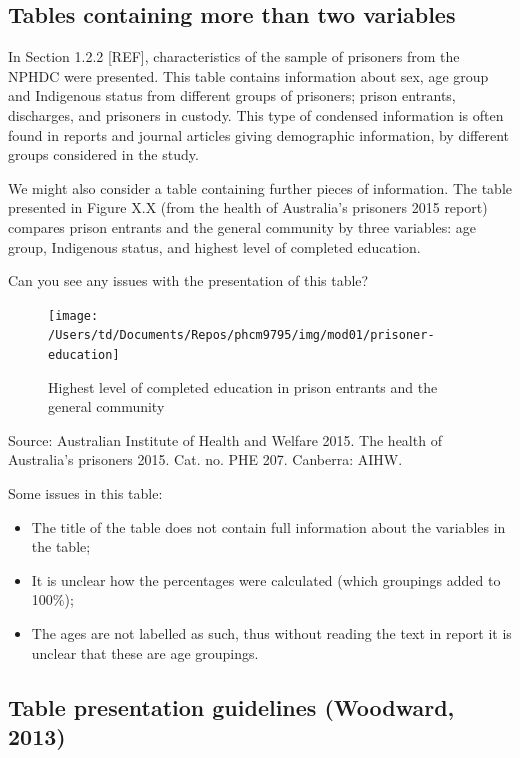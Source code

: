 \documentclass[
]{memoir}
\providecommand{\tightlist}{%
  \setlength{\itemsep}{0pt}\setlength{\parskip}{0pt}}
\begin{document}
\hypertarget{tables-containing-more-than-two-variables}{%
\subsection{Tables containing more than two variables}\label{tables-containing-more-than-two-variables}}

In Section 1.2.2 {[}REF{]}, characteristics of the sample of prisoners from the NPHDC were presented. This table contains information about sex, age group and Indigenous status from different groups of prisoners; prison entrants, discharges, and prisoners in custody. This type of condensed information is often found in reports and journal articles giving demographic information, by different groups considered in the study.

We might also consider a table containing further pieces of information. The table presented in Figure X.X (from the health of Australia's prisoners 2015 report) compares prison entrants and the general community by three variables: age group, Indigenous status, and highest level of completed education.

Can you see any issues with the presentation of this table?

\begin{figure}
\texttt{[image: /Users/td/Documents/Repos/phcm9795/img/mod01/prisoner-education]} \caption{Highest level of completed education in prison entrants and the general community}\label{fig:fig-prison-education}
\end{figure}

Source: Australian Institute of Health and Welfare 2015. The health of Australia's prisoners 2015. Cat. no. PHE 207. Canberra: AIHW.

Some issues in this table:

\begin{itemize}
\tightlist
\item
  The title of the table does not contain full information about the variables in the table;
\item
  It is unclear how the percentages were calculated (which groupings added to 100\%);
\item
  The ages are not labelled as such, thus without reading the text in report it is unclear that these are age groupings.
\end{itemize}

\hypertarget{table-presentation-guidelines-woodward-2013}{%
\subsection{Table presentation guidelines (Woodward, 2013)}\label{table-presentation-guidelines-woodward-2013}}
\end{document}
